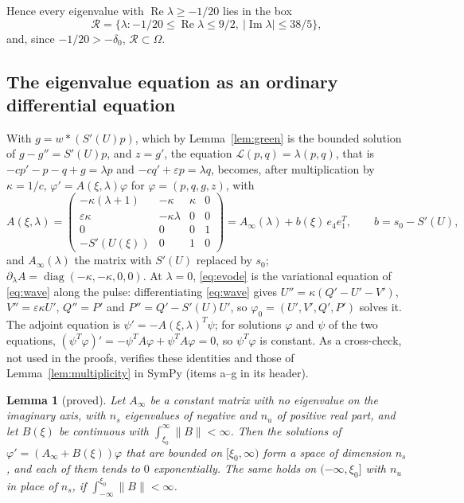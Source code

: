 \documentclass[11pt]{article}
\newtheorem{lemma}{Lemma}[section]
\theoremstyle{definition}
\newcommand{\eps}{\varepsilon}
\newcommand{\re}{\operatorname{Re}}
\newcommand{\im}{\operatorname{Im}}
\newcommand{\Lop}{\mathcal{L}}
\newcommand{\Rbox}{\mathcal{R}}
\newcommand{\dz}{\delta_0}
\begin{document}
Hence every eigenvalue with $\re\lambda \ge -1/20$ lies in the box
\[
  \Rbox = \{\lambda : -1/20 \le \re\lambda \le 9/2,\ |\im\lambda| \le 38/5\},
\]
and, since $-1/20 > -\dz$, $\Rbox \subset \Omega$.

\subsection{The eigenvalue equation as an ordinary differential equation}

With $g = w * (S'(U)p)$, which by Lemma~\ref{lem:green} is the bounded solution of $g - g'' = S'(U)p$, and $z = g'$, the equation $\Lop(p, q) = \lambda(p, q)$, that is $-cp' - p - q + g = \lambda p$ and $-cq' + \eps p = \lambda q$, becomes, after multiplication by $\kappa = 1/c$, $\varphi' = A(\xi, \lambda)\varphi$ for $\varphi = (p, q, g, z)$, with
\begin{equation}\label{eq:evode}
  A(\xi, \lambda) = \begin{pmatrix} -\kappa(\lambda + 1) & -\kappa & \kappa & 0 \\ \eps\kappa & -\kappa\lambda & 0 & 0 \\ 0 & 0 & 0 & 1 \\ -S'(U(\xi)) & 0 & 1 & 0 \end{pmatrix} = A_\infty(\lambda) + b(\xi)\, e_4 e_1^T, \qquad b = s_0 - S'(U),
\end{equation}
and $A_\infty(\lambda)$ the matrix with $S'(U)$ replaced by $s_0$; $\partial_\lambda A = \operatorname{diag}(-\kappa, -\kappa, 0, 0)$. At $\lambda = 0$, \eqref{eq:evode} is the variational equation of \eqref{eq:wave} along the pulse: differentiating \eqref{eq:wave} gives $U'' = \kappa(Q' - U' - V')$, $V'' = \eps\kappa U'$, $Q'' = P'$ and $P'' = Q' - S'(U)U'$, so $\varphi_0 = (U', V', Q', P')$ solves it. The adjoint equation is $\psi' = -A(\xi, \lambda)^T\psi$; for solutions $\varphi$ and $\psi$ of the two equations, $(\psi^T\varphi)' = -\psi^TA\varphi + \psi^TA\varphi = 0$, so $\psi^T\varphi$ is constant. As a cross-check, not used in the proofs,  verifies these identities and those of Lemma~\ref{lem:multiplicity} in SymPy (items a--g in its header).

\begin{lemma}[proved]\label{lem:lp}
Let $A_\infty$ be a constant matrix with no eigenvalue on the imaginary axis, with $n_s$ eigenvalues of negative and $n_u$ of positive real part, and let $B(\xi)$ be continuous with $\int_{\xi_0}^\infty\|B\| < \infty$. Then the solutions of $\varphi' = (A_\infty + B(\xi))\varphi$ that are bounded on $[\xi_0, \infty)$ form a space of dimension $n_s$, and each of them tends to $0$ exponentially. The same holds on $(-\infty, \xi_0]$ with $n_u$ in place of $n_s$, if $\int_{-\infty}^{\xi_0}\|B\| < \infty$.
\end{lemma}
\end{document}
